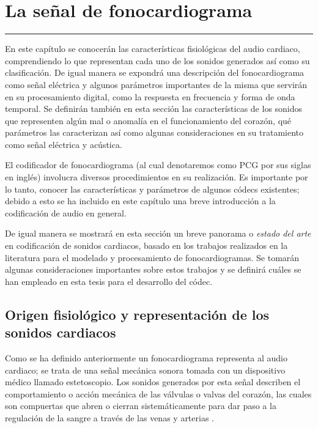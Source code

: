 \chapter{La señal de fonocardiograma}\label{capit:cap2}
\vspace{-2.0325ex}%
\noindent
\rule{\textwidth}{0.5pt}
\vspace{-5.5ex}%
\newcommand{\pushline}{\Indp}%



En este capítulo se conocerán las características fisiológicas del audio cardiaco, comprendiendo lo que representan cada uno de los sonidos generados así como su clasificación. De igual manera se expondrá una descripción del fonocardiograma como señal eléctrica y algunos parámetros importantes de la misma que servirán en su procesamiento digital, como la respuesta en frecuencia y forma de onda temporal. Se definirán también en esta sección las características de los sonidos que representen algún mal o anomalía en el funcionamiento del corazón, qué parámetros las caracterizan así como algunas consideraciones en su tratamiento como señal eléctrica y acústica. 

El codificador de fonocardiograma (al cual denotaremos como PCG por sus siglas en inglés) involucra diversos procedimientos en su realización. Es importante por lo tanto, conocer las características y parámetros de algunos códecs existentes; debido a esto se ha incluido en este capítulo una breve introducción a la codificación de audio en general.

De igual manera se mostrará en esta sección un breve panorama o \emph{estado del arte} en codificación de sonidos cardiacos, basado en los trabajos realizados en la literatura para el modelado y procesamiento de fonocardiogramas. Se tomarán algunas consideraciones importantes sobre estos trabajos y se definirá cuáles se han empleado en esta tesis para el desarrollo del códec.

\section{Origen fisiológico y representación de los sonidos cardiacos}

Como se ha definido anteriormente un fonocardiograma representa al audio cardiaco; se trata de una señal mecánica sonora tomada con un dispositivo médico llamado estetoscopio. Los sonidos generados por esta señal describen el comportamiento o acción mecánica de las válvulas o valvas del corazón, las cuales son compuertas que abren o cierran sistemáticamente para dar paso a la regulación de la sangre a través de las venas y arterias \cite[]{Abbas2009}. 

